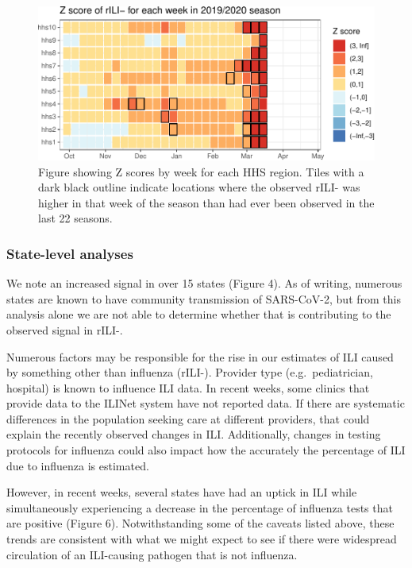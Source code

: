 \documentclass[]{article}
\begin{document}
\begin{figure}
\centering
\includegraphics{ili-labtest-report_files/figure-latex/std-dev-analysis-1.pdf}
\caption{Figure showing Z scores by week for each HHS region. Tiles with
a dark black outline indicate locations where the observed rILI- was
higher in that week of the season than had ever been observed in the
last 22 seasons.}
\end{figure}

\hypertarget{state-level-analyses}{%
\subsubsection{State-level analyses}\label{state-level-analyses}}

We note an increased signal in over 15 states (Figure 4). As of writing,
numerous states are known to have community transmission of SARS-CoV-2,
but from this analysis alone we are not able to determine whether that
is contributing to the observed signal in rILI-.

Numerous factors may be responsible for the rise in our estimates of ILI
caused by something other than influenza (rILI-). Provider type
(e.g.~pediatrician, hospital) is known to influence ILI data. In recent
weeks, some clinics that provide data to the ILINet system have not
reported data. If there are systematic differences in the population
seeking care at different providers, that could explain the recently
observed changes in ILI. Additionally, changes in testing protocols for
influenza could also impact how the accurately the percentage of ILI due
to influenza is estimated.

However, in recent weeks, several states have had an uptick in ILI while
simultaneously experiencing a decrease in the percentage of influenza
tests that are positive (Figure 6). Notwithstanding some of the caveats
listed above, these trends are consistent with what we might expect to
see if there were widespread circulation of an ILI-causing pathogen that
is not influenza.
\end{document}

